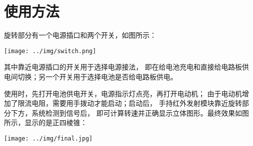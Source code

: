 
\section{使用方法}
旋转部分有一个电源插口和两个开关，如图所示：
\begin{center}
	\texttt{[image: ../img/switch.png]}
\end{center}
其中靠近电源插口的开关用于选择电源接法，
即在给电池充电和直接给电路板供电间切换；另一个开关用于选择电池是否给电路板供电。

使用时，先打开电池供电开关，电源指示灯点亮，再打开电动机；
由于电动机增加了限流电阻，需要用手拨动才能启动；启动后，
手持红外发射模块靠近旋转部分下方，系统检测到信号后，
即可计算转速并正确显示立体图形。最终效果如图所示，显示的是正四棱锥：
\begin{center}
	\texttt{[image: ../img/final.jpg]}
\end{center}


